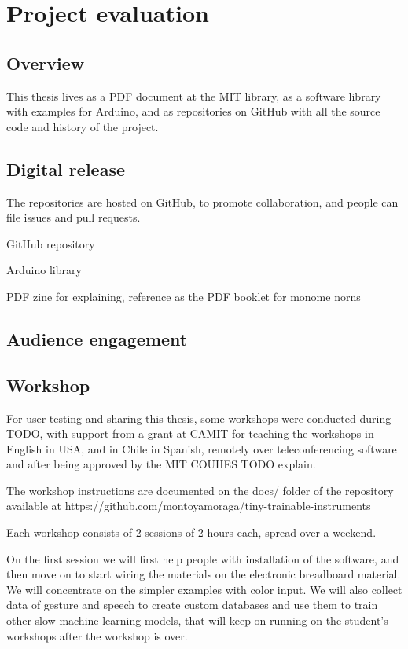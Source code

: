 \chapter{Project evaluation}

\section{Overview}

This thesis lives as a PDF document at the MIT library, as a software library with examples for Arduino, and as repositories on GitHub with all the source code and history of the project.

\section{Digital release}

The repositories are hosted on GitHub, to promote collaboration, and people can file issues and pull requests.

GitHub repository

Arduino library

PDF zine for explaining, reference as the PDF booklet for monome norns

\section{Audience engagement}


\section{Workshop}

For user testing and sharing this thesis, some workshops were conducted during TODO, with support from a grant at CAMIT for teaching the workshops in English in USA, and in Chile in Spanish, remotely over teleconferencing software and after being approved by the MIT COUHES TODO explain.

The workshop instructions are documented on the docs/ folder of the repository available at https://github.com/montoyamoraga/tiny-trainable-instruments

Each workshop consists of 2 sessions of 2 hours each, spread over a weekend.

On the first session we will first help people with installation of the software, and then move on to start wiring the materials on the electronic breadboard material. We will concentrate on the simpler examples with color input. We will also collect data of gesture and speech to create custom databases and use them to train other slow machine learning models, that will keep on running on the student's workshops after the workshop is over.


